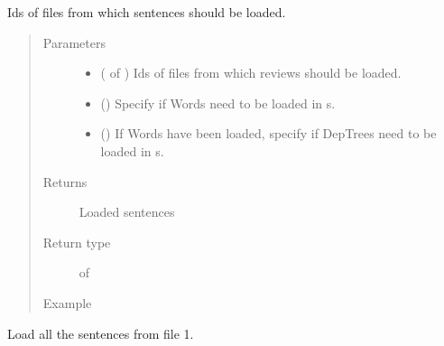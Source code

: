 \documentclass[letterpaper,10pt,english]{sphinxmanual}
\begin{document}
\begin{fulllineitems}
\label{\detokenize{load:loacore.load.sentence_load.load_sentences_by_id_files}}
Ids of files from which sentences should be loaded.
\begin{quote}\begin{description}
\item[{Parameters}] \leavevmode\begin{itemize}
\item {} 
 ( of ) \textendash{} Ids of files from which reviews should be loaded.

\item {} 
 () \textendash{} Specify if Words need to be loaded in  s.

\item {} 
 () \textendash{} If Words have been loaded, specify if DepTrees need to be loaded in  s.

\end{itemize}

\item[{Returns}] \leavevmode
Loaded sentences

\item[{Return type}] \leavevmode
{} of 

\item[{Example}] \leavevmode
\end{description}\end{quote}

Load all the sentences from file 1.

%
\begin{sphinxVerbatim}[commandchars=\\\{\}]
   
  \PYG{p}{[}\PYG{p}{]}
\PYG{p}{[}\PYG{p}{]}
\end{sphinxVerbatim}

\end{fulllineitems}
\end{document}
